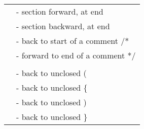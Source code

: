 \documentclass[a4paper,8pt]{extarticle}
\begin{document}
\begin{multicols*}{3}
\begin{tabular}{ l l }
            \tb{][}                                     &   - section forward, at end                               \\
            \tb{[]}                                     &   - section backward, at end                              \\
            \tb{[*}                                     &   - back to start of a comment /*                         \\
            \tb{]*}                                     &   - forward to end of a comment */                        \\
                                                        &                                                           \\
            \tb{[(}                                     &   - back to unclosed (                                    \\
            \tb{[\{}                                    &   - back to unclosed \{                                   \\
            \tb{[)}                                     &   - back to unclosed )                                    \\
            \tb{[\}}                                    &   - back to unclosed \}                                   \\
        \end{tabular}\\

        \columnbreak


\end{multicols*}
\end{document}
